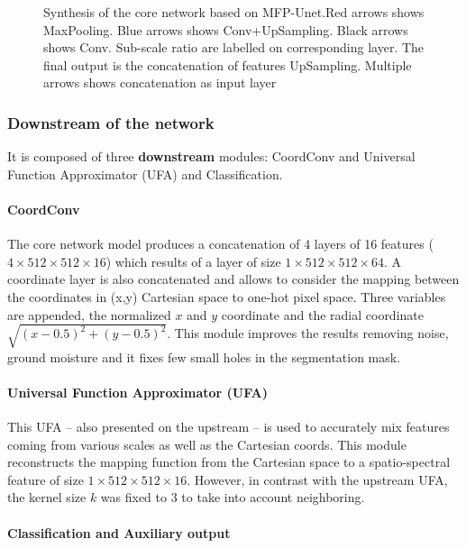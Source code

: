 \documentclass[../thesis.tex]{subfiles}
\begin{document}
    \begin{figure}[H]
        \centering
        
        \caption{Synthesis of the core network based on MFP-Unet.Red arrows shows MaxPooling. Blue arrows shows Conv+UpSampling. Black arrows shows Conv. Sub-scale ratio are labelled on corresponding layer. The final output is the concatenation of features UpSampling. Multiple arrows shows concatenation as input layer}
        \label{fig:07-mfp-unet}
    \end{figure}
    \subsubsection{Downstream of the network} %
    It is composed of three \textbf{downstream} modules: CoordConv and Universal  Function  Approximator  (UFA) and Classification.
    \paragraph{CoordConv} The core network model produces a concatenation of 4 layers of 16 features ($4 \times 512 \times 512 \times 16$) which results of a layer of size $1 \times 512 \times 512 \times 64$. A coordinate layer \cite{liu2018intriguing} is also concatenated and allows to consider the mapping between the coordinates in (x,y) Cartesian space to one-hot pixel space. Three variables are appended, the normalized $x$ and $y$ coordinate and the radial coordinate $\sqrt{(x-0.5)^2+(y-0.5)^2}$. This module improves the results removing noise, ground moisture and it fixes few small holes in the segmentation mask.
    
    \paragraph{Universal Function Approximator (UFA)} This UFA -- also presented on the upstream -- is used to accurately mix features coming from various scales as well as the Cartesian coords. This module reconstructs the mapping function from the Cartesian space to a spatio-spectral feature of size $1 \times 512 \times 512 \times 16$. However, in contrast with the upstream UFA, the kernel size $k$ was fixed to $3$ to take into account neighboring.
    
    \paragraph{Classification and Auxiliary output}
    
\end{document}
